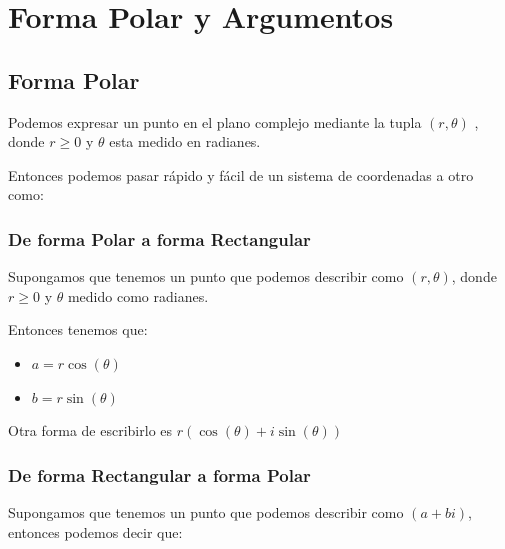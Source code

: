 \documentclass[12pt, fleqn]{report}                             %
\theoremstyle{break}                                            %
\newcommand{\Wrap}[1]           {\left( #1 \right)}             %
\newcommand{\Cos}[1] {\cos\Wrap{#1}}                            %
\newcommand{\Sin}[1] {\sin\Wrap{#1}}                            %
\begin{document}
    \chapter{Forma Polar y Argumentos}

        \clearpage
        \section{Forma Polar}
            
            Podemos expresar un punto en el plano complejo mediante la tupla $(r, \theta)$ , donde
            $r \geq 0$ y $\theta$ esta medido en radianes.

            Entonces podemos pasar rápido y fácil de un sistema de coordenadas a otro como:

            \subsection{De forma Polar a forma Rectangular}

                Supongamos que tenemos un punto que podemos describir como $(r, \theta)$,
                donde $r \geq 0$ y $\theta$ medido como radianes.

                Entonces tenemos que:

                \begin{itemize}
                     \item $a = r \Cos{\theta}$
                     \item $b = r \Sin{\theta}$
                 \end{itemize}

                 Otra forma de escribirlo es $r(\Cos{\theta} + i\Sin{\theta})$

            \subsection{De forma Rectangular a forma Polar}

                Supongamos que tenemos un punto que podemos describir como $(a+bi)$,
                entonces podemos decir que:
\end{document}
